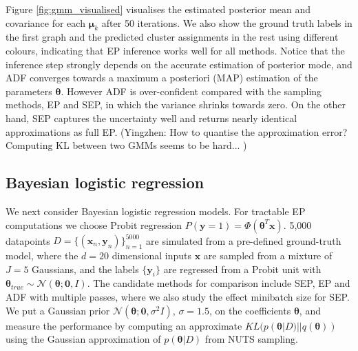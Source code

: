 Figure \ref{fig:gmm_visualised} visualises the estimated posterior mean and covariance for each $\bm{\mu}_k$ after 50 iterations. We also show the ground truth labels in the first graph and the predicted cluster assignments in the rest using different colours, indicating that EP inference works well for all methods. Notice that the inference step strongly depends on the accurate estimation of posterior mode, and ADF converges towards a maximum a posteriori (MAP) estimation of the parameters $\bm{\theta}$. However ADF is over-confident compared with the sampling methods, EP and SEP, in which the variance shrinks towards zero. On the other hand, SEP captures the uncertainty well and returns nearly identical approximations as full EP. (Yingzhen: How to quantise the approximation error? Computing KL between two GMMs seems to be hard... )


\subsection{Bayesian logistic regression}
We next consider Bayesian logistic regression models. For tractable EP computations we choose Probit regression $P(\bm{y} = 1) = \Phi(\bm{\theta}^T \bm{x})$. 5,000 datapoints $D = \{ (\bm{x}_n, \bm{y}_n) \}_{n=1}^{5000}$ are simulated from a pre-defined ground-truth model, where the $d = 20$ dimensional inputs $\bm{x}$ are sampled from a mixture of $J = 5$ Gaussians, and the labels $\{\bm{y}_i\}$ are regressed from a Probit unit with $\bm{\theta}_{true} \sim \mathcal{N}(\bm{\theta}; \bm{0}, I)$. The candidate methods for comparison include SEP, EP and ADF with multiple passes, where we also study the effect minibatch size for SEP. We put a Gaussian prior $\mathcal{N}(\bm{\theta}; \bm{0}, \sigma^2 I)$, $\sigma = 1.5$, on the coefficients $\bm{\theta}$, and measure the performance by computing an approximate $KL(p(\bm{\theta}|D) || q(\bm{\theta}))$ using the Gaussian approximation of $p(\bm{\theta}|D)$ from NUTS sampling. 

